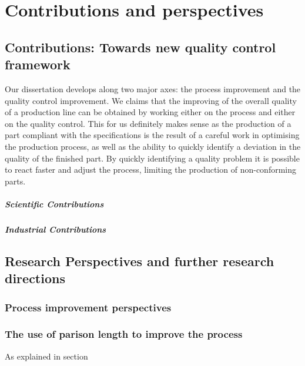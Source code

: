 \chapter{Contributions and perspectives} \label{Contributions and perspectives}
\minitoc


\section{Contributions: Towards new quality control framework}

Our dissertation develops along two major axes: the process improvement and the quality control improvement. We claims that the improving of the overall quality of a production line can be obtained by working either on the process and either on the quality control. This for us definitely makes sense as the production of a part compliant with the specifications is the result of a careful work in optimising the production process, as well as the ability to quickly identify a deviation in the quality of the finished part. By quickly identifying a quality problem it is possible to react faster and adjust the process, limiting the production of non-conforming parts.




\paragraph{Scientific Contributions}

\paragraph{Industrial Contributions}

\section{Research Perspectives and further research directions}

\subsection{Process improvement perspectives}

\subsection{The use of parison length to improve the process}

As explained in section 


